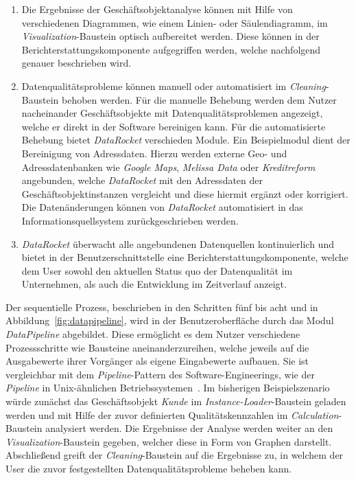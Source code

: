 \documentclass[
  language=german, %
  type=bachelor,%
  ngerman
]{isthesis}
\begin{document}
\begin{content}
\begin{enumerate}
		\item Die Ergebnisse der Geschäftsobjektanalyse können mit Hilfe von
		verschiedenen Diagrammen, wie \zB{} einem Linien- oder Säulendiagramm, im
		\textit{Visualization}-Baustein optisch aufbereitet werden. Diese können in
		der Berichterstattungskomponente aufgegriffen werden, welche nachfolgend
		genauer beschrieben wird.

		\item Datenqualitätsprobleme können manuell oder automatisiert im
		\textit{Cleaning}-Baustein behoben werden. Für die manuelle Behebung werden
		dem Nutzer nacheinander Geschäftsobjekte mit Datenqualitätsproblemen
		angezeigt, welche er direkt in der Software bereinigen kann. Für die
		automatisierte Behebung bietet \textit{DataRocket} verschieden Module. Ein
		Beispiel\-modul dient der Bereinigung von Adressdaten. Hierzu werden
		externe Geo- und Adressdatenbanken wie \zB{} \textit{Google Maps},
		\textit{Melissa Data} oder \textit{Kreditreform} angebunden, welche
		\textit{DataRocket} mit den Adressdaten der Geschäftsobjektinstanzen
		vergleicht und diese hiermit \ggf{} ergänzt oder korrigiert. Die
		Datenänderungen können von \textit{DataRocket} automatisiert in das
		Informationsquellsystem zurückgeschrieben werden.

    \item \textit{DataRocket} überwacht alle angebundenen Datenquellen
      kontinuierlich und bietet in der Benutzerschnittstelle eine
      Berichterstattungskomponente, welche dem User sowohl den aktuellen Status
      quo der Datenqualität im Unternehmen, als auch die Entwicklung im
      Zeitverlauf anzeigt.
	\end{enumerate}

	Der sequentielle Prozess, beschrieben in den Schritten fünf bis acht und in Abbildung~\ref{fig:datapipeline}, wird in
	der Benutzeroberfläche durch das Modul \textit{DataPipeline} abgebildet.
	Diese ermöglicht es dem Nutzer verschiedene Prozessschritte wie Bausteine
	aneinanderzureihen, welche jeweils auf die Ausgabewerte ihrer Vorgänger als
	eigene Eingabewerte aufbauen. Sie ist vergleichbar mit dem
	\textit{Pipeline}-Pattern des Software-Engineerings, wie \zB{} der
	\textit{Pipeline} in Unix-ähnlichen
	Betriebssystemen~\cite[][]{spinellis2001notable}. Im bisherigen
	Beispielszenario würde zunächst das Geschäftsobjekt \textit{Kunde} im
	\textit{Instance-Loader}-Baustein geladen werden und mit Hilfe der zuvor
	definierten Qualitätskennzahlen im \textit{Calculation}-Baustein analysiert
	werden. Die Ergebnisse der Analyse werden weiter an den
	\textit{Visualization}-Baustein gegeben, welcher diese in Form von Graphen
	darstellt. Abschließend greift der \textit{Cleaning}-Baustein auf die
	Ergebnisse zu, in welchem der User die zuvor festgestellten
	Datenqualitätsprobleme beheben kann.


\end{content}
\end{document}
